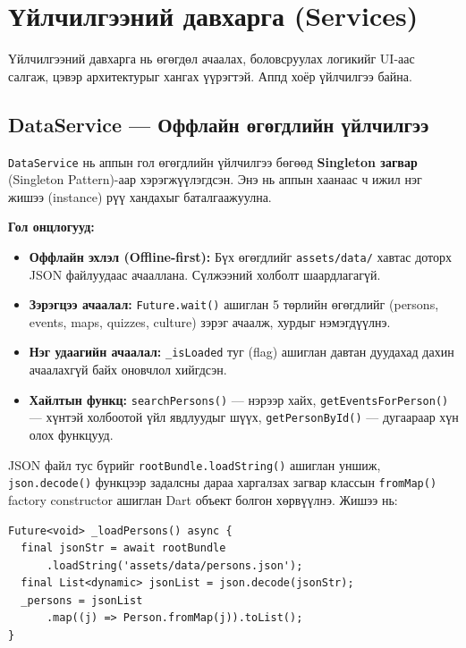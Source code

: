 \section{Үйлчилгээний давхарга (Services)}

Үйлчилгээний давхарга нь өгөгдөл ачаалах, боловсруулах логикийг UI-аас салгаж, цэвэр архитектурыг хангах үүрэгтэй. Аппд хоёр үйлчилгээ байна.

\subsection{DataService — Оффлайн өгөгдлийн үйлчилгээ}

\texttt{DataService} нь аппын гол өгөгдлийн үйлчилгээ бөгөөд \textbf{Singleton загвар} (Singleton Pattern)-аар хэрэгжүүлэгдсэн. Энэ нь аппын хаанаас ч ижил нэг жишээ (instance) рүү хандахыг баталгаажуулна.

\textbf{Гол онцлогууд:}

\begin{itemize}
	\item \textbf{Оффлайн эхлэл (Offline-first):} Бүх өгөгдлийг \texttt{assets/data/} хавтас доторх JSON файлуудаас ачааллана. Сүлжээний холболт шаардлагагүй.
	\item \textbf{Зэрэгцээ ачаалал:} \texttt{Future.wait()} ашиглан 5 төрлийн өгөгдлийг (persons, events, maps, quizzes, culture) зэрэг ачаалж, хурдыг нэмэгдүүлнэ.
	\item \textbf{Нэг удаагийн ачаалал:} \texttt{\_isLoaded} туг (flag) ашиглан давтан дуудахад дахин ачаалахгүй байх оновчлол хийгдсэн.
	\item \textbf{Хайлтын функц:} \texttt{searchPersons()} — нэрээр хайх, \texttt{getEventsForPerson()} — хүнтэй холбоотой үйл явдлуудыг шүүх, \texttt{getPersonById()} — дугаараар хүн олох функцууд.
\end{itemize}

JSON файл тус бүрийг \texttt{rootBundle.loadString()} ашиглан уншиж, \texttt{json.decode()} функцээр задалсны дараа харгалзах загвар классын \texttt{fromMap()} factory constructor ашиглан Dart объект болгон хөрвүүлнэ. Жишээ нь:

\begin{verbatim}
Future<void> _loadPersons() async {
  final jsonStr = await rootBundle
      .loadString('assets/data/persons.json');
  final List<dynamic> jsonList = json.decode(jsonStr);
  _persons = jsonList
      .map((j) => Person.fromMap(j)).toList();
}
\end{verbatim}

